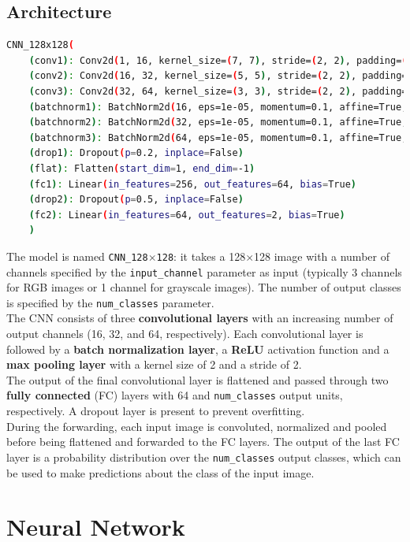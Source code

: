 \documentclass{report}
\begin{document}
\subsection{Architecture}
\begin{lstlisting}[language=bash]
CNN_128x128(
    (conv1): Conv2d(1, 16, kernel_size=(7, 7), stride=(2, 2), padding=(1, 1))
    (conv2): Conv2d(16, 32, kernel_size=(5, 5), stride=(2, 2), padding=(1, 1))
    (conv3): Conv2d(32, 64, kernel_size=(3, 3), stride=(2, 2), padding=(1, 1))
    (batchnorm1): BatchNorm2d(16, eps=1e-05, momentum=0.1, affine=True, track_running_stats=True)
    (batchnorm2): BatchNorm2d(32, eps=1e-05, momentum=0.1, affine=True, track_running_stats=True)
    (batchnorm3): BatchNorm2d(64, eps=1e-05, momentum=0.1, affine=True, track_running_stats=True)
    (drop1): Dropout(p=0.2, inplace=False)
    (flat): Flatten(start_dim=1, end_dim=-1)
    (fc1): Linear(in_features=256, out_features=64, bias=True)
    (drop2): Dropout(p=0.5, inplace=False)
    (fc2): Linear(in_features=64, out_features=2, bias=True)
    )
\end{lstlisting}
The model is named \texttt{CNN\_128$\times$128}: it takes a 128$\times$128 image with a number of channels specified by the \texttt{input\_channel} parameter as input 
(typically 3 channels for RGB images or 1 channel for grayscale images). The number of output classes is specified by the \texttt{num\_classes} parameter.\\
The CNN consists of three \textbf{convolutional layers} with an increasing number of output channels (16, 32, and 64, respectively). Each convolutional layer is followed by a \textbf{batch normalization layer},
a \textbf{ReLU} activation function and a \textbf{max pooling layer} with a kernel size of 2 and a stride of 2. \\
The output of the final convolutional layer is flattened and passed through two \textbf{fully connected} (FC) layers with 64 and \texttt{num\_classes} output units, respectively.
A dropout layer is present to prevent overfitting.\\

During the forwarding, each input image is convoluted, normalized and pooled before being flattened and forwarded to the FC layers.
The output of the last FC layer is a probability distribution over the \texttt{num\_classes} output classes, which can be used to make predictions about the class of the input image.


\section{Neural Network}
\end{document}
